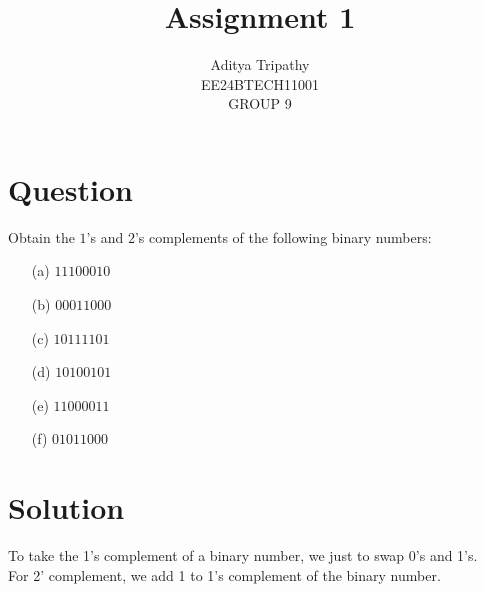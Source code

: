 \documentclass{article}
\title{Assignment 1}
\author{Aditya Tripathy\\EE24BTECH11001\\GROUP 9}
\begin{document}
\maketitle
\section{Question}
Obtain the $1$'s and $2$'s complements of the following binary numbers:
\begin{enumerate}
    \item[(a)] \(11100010\)
    \item[(b)] \(00011000\)
    \item[(c)] \(10111101\)
    \item[(d)] \(10100101\)
    \item[(e)] \(11000011\)
    \item[(f)] \(01011000\)
\end{enumerate}
\section{Solution}

To take the 1's complement of a binary number, we just to swap 0's and 1's.\\
For 2' complement, we add 1 to 1's complement of the binary number.
\end{document}
